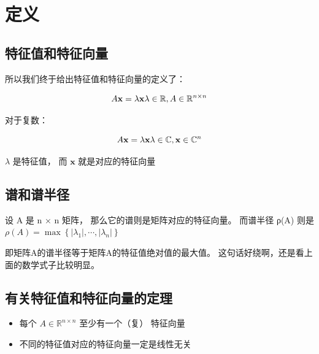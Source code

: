 \documentclass[
]{book}
\providecommand{\tightlist}{%
  \setlength{\itemsep}{0pt}\setlength{\parskip}{0pt}}
\begin{document}
\hypertarget{ux5b9aux4e49}{%
\section{定义}\label{ux5b9aux4e49}}

\hypertarget{ux7279ux5f81ux503cux548cux7279ux5f81ux5411ux91cf}{%
\subsection{特征值和特征向量}\label{ux7279ux5f81ux503cux548cux7279ux5f81ux5411ux91cf}}

所以我们终于给出特征值和特征向量的定义了：

\[
A\mathbf{x} = \lambda \mathbf{x}\\
\lambda \in \mathbb{R} , A \in \mathbb{R}^{n \times n}
\]

对于复数：

\[
A\mathbf{x} = \lambda \mathbf{x}\\
\lambda \in \mathbb{C} , \mathbf{x} \in \mathbb{C}^n
\]

\(\lambda\) 是特征值， 而 \(\mathbf{x}\) 就是对应的特征向量

\hypertarget{ux8c31ux548cux8c31ux534aux5f84}{%
\subsection{谱和谱半径}\label{ux8c31ux548cux8c31ux534aux5f84}}

设 A 是 n × n 矩阵， 那么它的谱则是矩阵对应的特征向量。
而谱半径 ρ(A) 则是 \(\rho(A) = \max \left \{ |\lambda_1|, \cdots, |\lambda_n| \right \}\)

即矩阵A的谱半径等于矩阵A的特征值绝对值的最大值。 这句话好绕啊，还是看上面的数学式子比较明显。

\hypertarget{ux6709ux5173ux7279ux5f81ux503cux548cux7279ux5f81ux5411ux91cfux7684ux5b9aux7406}{%
\subsection{有关特征值和特征向量的定理}\label{ux6709ux5173ux7279ux5f81ux503cux548cux7279ux5f81ux5411ux91cfux7684ux5b9aux7406}}

\begin{itemize}
\tightlist
\item
  每个 \(A \in \mathbb{R}^{n \times n}\) 至少有一个（复） 特征向量
\item
  不同的特征值对应的特征向量一定是线性无关
\end{itemize}
\end{document}

